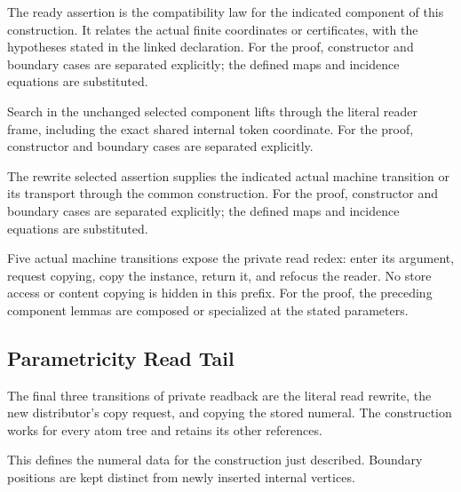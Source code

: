 The ready assertion is the compatibility law for the indicated component of this construction. It relates the actual finite coordinates or certificates, with the hypotheses stated in the linked declaration.
For the proof, constructor and boundary cases are separated explicitly; the defined maps and incidence equations are substituted.
\par{}

Search in the unchanged selected component lifts through the literal reader frame, including the exact shared internal token coordinate.
For the proof, constructor and boundary cases are separated explicitly.
\par{}

The rewrite selected assertion supplies the indicated actual machine transition or its transport through the common construction.
For the proof, constructor and boundary cases are separated explicitly; the defined maps and incidence equations are substituted.
\par{}

Five actual machine transitions expose the private read redex: enter its argument, request copying, copy the instance, return it, and refocus the reader. No store access or content copying is hidden in this prefix.
For the proof, the preceding component lemmas are composed or specialized at the stated parameters.
\par{}

\subsection{Parametricity Read Tail}
The final three transitions of private readback are the literal read rewrite, the new distributor's copy request, and copying the stored numeral. The construction works for every atom tree and retains its other references.

This defines the numeral data for the construction just described. Boundary positions are kept distinct from newly inserted internal vertices.
\par{}

